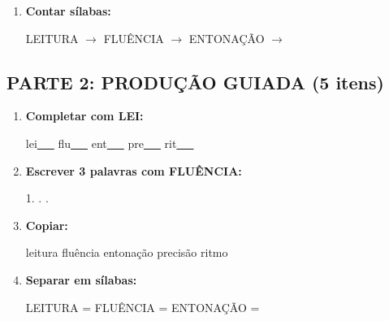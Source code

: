 \begin{exercicio}
\begin{enumerate}
  \item \textbf{Contar sílabas:}
  \begin{center}
  LEITURA $\rightarrow$ \underline{\hspace{0.9cm}} \quad FLUÊNCIA $\rightarrow$ \underline{\hspace{0.9cm}} \quad ENTONAÇÃO $\rightarrow$ \underline{\hspace{0.9cm}}
  \end{center}

\end{enumerate}

\subsection*{PARTE 2: PRODUÇÃO GUIADA (5 itens)}

\begin{enumerate}[resume]

  \item \textbf{Completar com LEI:}
  \begin{center}
  lei\underline{~~~} \quad flu\underline{~~~} \quad ent\underline{~~~} \quad pre\underline{~~~} \quad rit\underline{~~~}
  \end{center}

  \item \textbf{Escrever 3 palavras com FLUÊNCIA:}
  \begin{center}
  1. \underline{\hspace{3cm}} . \underline{\hspace{3cm}} . \underline{\hspace{3cm}}
  \end{center}

  \item \textbf{Copiar:}
  \begin{center}
  leitura \quad fluência \quad entonação \quad precisão \quad ritmo
  \end{center}

  \item \textbf{Separar em sílabas:}
  \begin{center}
  LEITURA = \underline{\hspace{1cm}} \underline{\hspace{1cm}} \quad FLUÊNCIA = \underline{\hspace{1cm}} \underline{\hspace{1cm}} \quad ENTONAÇÃO = \underline{\hspace{1cm}} \underline{\hspace{1cm}}
  \end{center}


\end{enumerate}
\end{exercicio}
